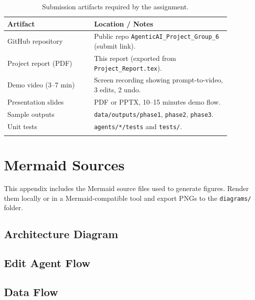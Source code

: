 \documentclass[11pt]{article}
\begin{document}
\begin{longtable}{|p{0.35\linewidth}|p{0.55\linewidth}|}
\hline
\textbf{Artifact} & \textbf{Location / Notes} \\
\hline
GitHub repository & Public repo \texttt{AgenticAI\_Project\_Group\_6} (submit link). \\
Project report (PDF) & This report (exported from \texttt{Project\_Report.tex}). \\
Demo video (3--7 min) & Screen recording showing prompt-to-video, 3 edits, 2 undo. \\
Presentation slides & PDF or PPTX, 10--15 minutes demo flow. \\
Sample outputs & \texttt{data/outputs/phase1}, \texttt{phase2}, \texttt{phase3}. \\
Unit tests & \texttt{agents/*/tests} and \texttt{tests/}. \\
\hline
\caption{Submission artifacts required by the assignment.}
\label{tab:deliverables}
\end{longtable}

\appendix
\section{Mermaid Sources}
\label{app:mermaid}
This appendix includes the Mermaid source files used to generate figures. Render them locally or in a Mermaid-compatible tool and export PNGs to the \texttt{diagrams/} folder.

\subsection{Architecture Diagram}

\subsection{Edit Agent Flow}

\subsection{Data Flow}
\end{document}
